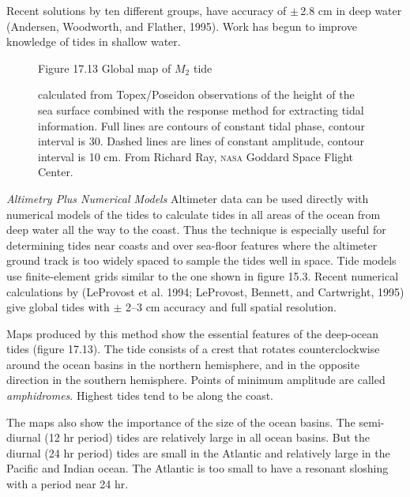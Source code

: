 Recent solutions by ten different groups, have
accuracy of $\pm \, $2.8 cm in deep water
(Andersen, Woodworth, and Flather, 1995). Work has begun to improve
knowledge of tides in shallow water.

\begin{figure}[t!]
\footnotesize
Figure 17.13 Global map of $M_2$ tide \rule{0mm}{4ex}calculated from
Topex/Poseidon observations of the
height of the sea surface combined with the response method for
extracting tidal information.  Full lines are contours of constant
tidal phase, contour interval is 30\degrees. Dashed lines are lines of
constant amplitude, contour interval is 10 cm. From Richard Ray,
\textsc{nasa} Goddard Space Flight Center.
\label{fig:m2_tide}
\vspace{-3ex}
\end{figure}

\textit{Altimetry Plus Numerical Models} Altimeter data can be used
directly with 
 numerical models of the tides to calculate
tides in all areas of the ocean from deep water all the way to the
coast. Thus the technique is especially useful for determining tides
near coasts and over sea-floor features where the altimeter ground
track is too widely spaced to sample the tides well in space. Tide
models use finite-element grids similar to the one shown in figure
15.3. Recent numerical calculations by (LeProvost et al. 1994;
LeProvost, Bennett, and Cartwright, 1995) give global tides with $\pm$
2--3 cm accuracy and full spatial resolution.

Maps produced by this method show the essential features of the
deep-ocean tides (figure 17.13). The tide consists of a crest that
rotates counterclockwise around the ocean basins in the northern
hemisphere, and in the opposite direction in the southern
hemisphere. Points of minimum amplitude are called
\textit{amphidromes}.
Highest tides tend to be along the coast.

The maps also show the importance of the size of the ocean basins. The
semi-diurnal (12 hr period) tides are
relatively large in all ocean basins. But the
diurnal (24 hr period) tides are small in the
Atlantic and relatively large in the Pacific and Indian ocean. The
Atlantic is too small to have a resonant sloshing with a period near
24 hr.

